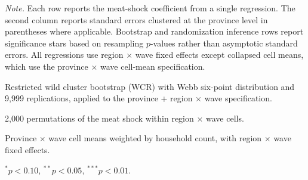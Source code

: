 \begin{table}[!htbp]
\begin{threeparttable}
\begin{tabular}{@{}lcccc@{}}
\bottomrule
\end{tabular}
\begin{tablenotes}[flushleft]
\footnotesize
\item \textit{Note.} Each row reports the meat-shock coefficient from a single regression. The second column reports standard errors clustered at the province level in parentheses where applicable. Bootstrap and randomization inference rows report significance stars based on resampling $p$-values rather than asymptotic standard errors. All regressions use region $\times$ wave fixed effects except collapsed cell means, which use the province $\times$ wave cell-mean specification.
\item[a] Restricted wild cluster bootstrap (WCR) with Webb six-point distribution and 9,999 replications, applied to the province + region $\times$ wave specification.
\item[b] 2,000 permutations of the meat shock within region $\times$ wave cells.
\item[c] Province $\times$ wave cell means weighted by household count, with region $\times$ wave fixed effects.
\item $^{*}p<0.10$, $^{**}p<0.05$, $^{***}p<0.01$.
\end{tablenotes}
\end{threeparttable}
\end{table}
